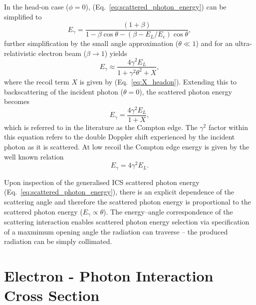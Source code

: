\documentclass[../main.tex]{subfiles}
\begin{document}
In the head-on case ($\phi=0$), (Eq.~\ref{eq:scattered_photon_energy}) can be simplified to 
\begin{equation}
E_{\gamma} = \frac{\left(1+\beta\right)}{1-\beta\cos\theta-\left(\beta-E_{L}/E_{e}\right)\cos\theta},
\label{eq:headon_scattered_photon_energy}
\end{equation}
further simplification by the small angle approximation ($\theta \ll 1$) and for an ultra-relativistic electron beam ($\beta \rightarrow 1$) yields
\begin{equation}
E_{\gamma} \approx \frac{4\gamma^{2}E_{L}}{1+\gamma^{2}\theta^{2}+X},    
\label{eq:small_angle_scattered_photon_energy}
\end{equation}
where the recoil term $X$ is given by (Eq.~\ref{eq:X_headon}). Extending this to backscattering of the incident photon ($\theta = 0$), the scattered photon energy becomes
\begin{equation}
E_{\gamma} = \frac{4\gamma^{2}E_{L}}{1+X},
\label{eq:headon_backscattering_scattered_photon_energy}
\end{equation}
which is referred to in the literature \cite{krafft2010compton} as the Compton edge. The $\gamma^{2}$ factor within this equation refers to the double Doppler shift experienced by the incident photon as it is scattered. At low recoil the Compton edge energy is given by the well known relation
\begin{equation}
E_{\gamma} = 4\gamma^{2}E_{L}.
\label{eq:compton_edge_energy}    
\end{equation}

Upon inspection of the generalised ICS scattered photon energy (Eq.~\ref{eq:scattered_photon_energy}), there is an explicit dependence of the scattering angle and therefore the scattered photon energy is proportional to the scattered photon energy ($E_{\gamma} \propto \theta$). The energy--angle correspondence of the scattering interaction enables scattered photon energy selection via specification of a maxmimum opening angle the radiation can traverse -- the produced radiation can be simply collimated.   

\section{Electron - Photon Interaction Cross Section}
\label{sec:electron_photon_interaction_cross_section}
\end{document}
